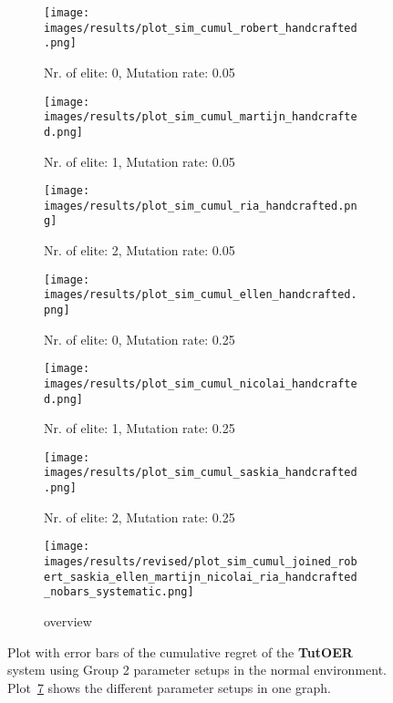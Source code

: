 \begin{figure}[ht]
	\begin{subfigure}{0.48\linewidth}
	\texttt{[image: images/results/plot\_sim\_cumul\_robert\_handcrafted.png]}
	\caption{Nr. of elite: 0, Mutation rate: 0.05}
	\label{fig:cumul_handcrafted_robert}
	\end{subfigure}
	\hfill
	\begin{subfigure}{0.48\linewidth}
	\texttt{[image: images/results/plot\_sim\_cumul\_martijn\_handcrafted.png]}
	\caption{Nr. of elite: 1, Mutation rate: 0.05}
	\label{fig:cumul_handcrafted_martijn}
	\end{subfigure}
	\begin{subfigure}{0.48\linewidth}
	\texttt{[image: images/results/plot\_sim\_cumul\_ria\_handcrafted.png]}
	\caption{Nr. of elite: 2, Mutation rate: 0.05}
	\label{fig:cumul_handcrafted_ria}
	\end{subfigure}
	\hfill
	\begin{subfigure}{0.48\linewidth}
	\texttt{[image: images/results/plot\_sim\_cumul\_ellen\_handcrafted.png]}
	\caption{Nr. of elite: 0, Mutation rate: 0.25}
	\label{fig:cumul_handcrafted_ellen}
	\end{subfigure}
	\begin{subfigure}{0.48\linewidth}
	\texttt{[image: images/results/plot\_sim\_cumul\_nicolai\_handcrafted.png]}
	\caption{Nr. of elite: 1, Mutation rate: 0.25}
	\label{fig:cumul_handcrafted_nicolai}
	\end{subfigure}
	\hfill
	\begin{subfigure}{0.48\linewidth}
	\texttt{[image: images/results/plot\_sim\_cumul\_saskia\_handcrafted.png]}
	\caption{Nr. of elite: 2, Mutation rate: 0.25}
	\label{fig:cumul_handcrafted_saskia}
	\end{subfigure}
	\begin{subfigure}{\linewidth}
	\texttt{[image: images/results/revised/plot\_sim\_cumul\_joined\_robert\_saskia\_ellen\_martijn\_nicolai\_ria\_handcrafted\_nobars\_systematic.png]}
	\caption{overview}
	\label{fig:cumul_handcrafted_overview_group2}
	\end{subfigure}
	\caption[Cumulative regret in normal simulated environment for group 2]{Plot with error bars of the cumulative regret of the \textbf{TutOER}
	system using Group 2 parameter setups in the normal environment.
	Plot~\ref{fig:cumul_handcrafted_overview_group2} shows the
	different parameter setups in one graph.}
	\label{fig:cumul_handcrafted_container_group2}
\end{figure}

